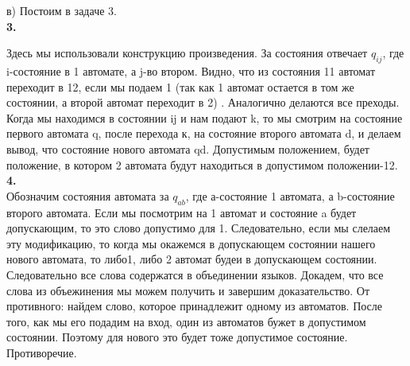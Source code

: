 \documentclass[a4paper,12pt]{article}
\begin{document}
в) Постоим в задаче 3.\\
\textbf{3.}\\
\begin{center} 
\end{center}
Здесь мы использовали конструкцию произведения. За состояния отвечает $q_{ij}$, где i-состояние в 1 автомате, а j-во втором. Видно, что из состояния 11 автомат переходит в 12, если мы подаем 1 (так как 1 автомат остается в том же состоянии, а второй автомат переходит в 2) . Аналогично делаются все преходы. Когда мы находимся в состоянии ij и нам подают k, то  мы смотрим на состояние первого автомата q, после перехода к, на состояние второго автомата d, и делаем вывод, что состояние нового автомата qd. Допустимым положением, будет положение, в котором 2 автомата будут находиться в допустимом положении-12.\\
\textbf{4.}\\
Обозначим состояния автомата за $q_{ab}$, где а-состояние 1 автомата, а b-состояние второго автомата. Если мы посмотрим на 1 автомат и состояние a будет допускающим, то это слово допустимо для 1. Следовательно, если мы слелаем эту модификацию, то когда мы окажемся в допускающем состоянии нашего нового автомата, то либо1, либо 2 автомат будеи в допускающем состоянии. Следовательно все слова содержатся в объединении языков. Докадем, что все слова из объежинения мы можем получить и завершим доказательство. От противного: найдем слово, которое принадлежит одному из автоматов. После того, как мы его подадим на вход, один из автоматов бужет в допустимом состоянии. Поэтому для нового это будет тоже допустимое состояние. Противоречие.\\
\end{document}
